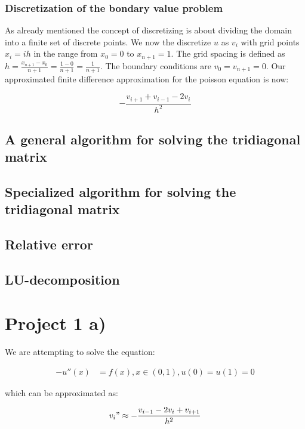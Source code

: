 \documentclass{article}
\begin{document}
\subsubsection{Discretization of the bondary value problem}

As already mentioned the concept of discretizing is about dividing the domain into a finite set of discrete points. We now the discretize $u$ as $v_i$ with grid points $x_i =  ih$  in the range from $x_0= 0$ to $x_{n+1}=1$. The grid spacing is defined as $h = \frac{x_{n+1}-x_0}{n+1} = \frac{1-0}{n+1} = \frac{1}{n+1}$. The boundary conditions are $v_0 = v_{n+1} = 0$. Our approximated finite difference approximation for the poisson equation is now:

\begin{equation} 
-\frac{v_{i+1} + v_{i-1} -2v_i}{h^2} 
\end{equation}



\subsection{A general algorithm for solving the tridiagonal matrix}
\subsection{Specialized algorithm for solving the tridiagonal matrix}
\subsection{Relative error}
\subsection{LU-decomposition}



\section{Project 1 a)}

We are attempting to solve the equation: 

\begin{align*}
	-u''(x) & = f(x), x \in (0, 1), u(0) = u(1) = 0
\end{align*}

which can be approximated as:

\begin{equation}
	v_i" \approx -\frac{v_{i-1}- 2v_i + v_{i+1}}{h^2}
\end{equation}
\end{document}
